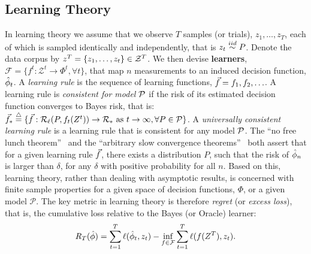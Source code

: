 \documentclass{article}
\begin{document}
\subsection{Learning Theory}

In learning theory we assume that we observe $T$ samples (or trials), $z_1,\ldots, z_T$, each of which is sampled identically and independently, that is $z_t \overset{iid}{\sim} P$.  Denote the data corpus by $z^T =\{z_1,\ldots, z_t\} \in \mathcal{Z}^T$.  
We then devise  \textbf{learners}, $\mathcal{F} = \{f^t : \mathcal{Z}^t \to \Phi^t, \forall t\}$, that map $n$ measurements to an induced decision function, $\hat{\phi}_t$. 
A \emph{learning rule} is the sequence of learning functions, $\vec{f}= f_1,f_2,\ldots$.  A learning rule is \emph{consistent for model $\mathcal{P}$} if the risk of its estimated decision function converges to Bayes risk, that is:
$\vec{f}_* \overset{\triangle}{=} \{ \vec{f} : \mathcal{R}_\ell(P,f_t(Z^t)) \to \mathcal{R}_* \text{ as } t \rightarrow \infty, \forall P \in \mathcal{P} \}$.
A \emph{universally consistent learning rule} is a learning rule that is consistent for any model $\mathcal{P}$. 
%
The ``no free lunch theorem''~\cite{Wolpert1996} and the ``arbitrary slow convergence theorems''~\cite{Devroye1993} both assert that for a given learning rule $\vec{f}$, there exists a distribution $P$, such that the risk of $\hat{\phi}_n$ is larger than $\delta$, for any $\delta$ with positive probability for all $n$.   Based on this,   learning theory, rather than dealing with asymptotic results, is concerned with finite sample properties for a given space of decision functions, $\Phi$, or a given model $\mathcal{P}$. 
The key metric in  learning theory is therefore \emph{regret} (or \emph{excess loss}), that is, the cumulative loss relative to the Bayes (or Oracle) learner:
\begin{align}
    R_T(\hat{\phi}) = \sum_{t=1}^T \ell(\hat{\phi}_t, z_t) - \inf_{f \in \mathcal{F}} \sum_{t=1}^T \ell ( f(Z^T), z_t).
\end{align}
\end{document}
